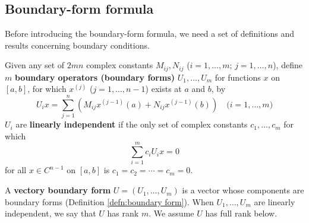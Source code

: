 \documentclass[11pt, oneside, a4paper]{article}
\begin{document}
\subsection{Boundary-form formula}
Before introducing the boundary-form formula, we need a set of definitions and results concerning boundary conditions.

\begin{defn}\label{defn:boundary form}
    Given any set of $2mn$ complex constants $M_{ij}, N_{ij}$ ($i=1,\ldots, m;\,j=1,\ldots,n$), define $m$ \textbf{boundary operators (boundary forms)} $U_1,\ldots,U_m$ for functions $x$ on $[a,b]$, for which $x^{(j)}$ ($j=1,\ldots,n-1$) exists at $a$ and $b$, by
    \begin{equation}\label{eq:U_i defn}
        U_i x = \sum_{j=1}^n (M_{ij}x^{(j-1)}(a) + N_{ij}x^{(j-1)}(b))\quad\mbox{($i=1,\ldots,m$)} 
    \end{equation}
    $U_i$ are \textbf{linearly independent} if the only set of complex constants $c_1, \ldots, c_m$ for which
    \[\sum_{i=1}^m c_i U_ix=0\]
    for all $x\in C^{n-1}$ on $[a,b]$ is $c_1=c_2=\cdots =c_m=0$.
\end{defn}

\begin{defn}\label{defn:vectory boundary form}
    A \textbf{vectory boundary form} $U=(U_1,\ldots,U_m)$ is a vector whose components are boundary forms (Definition \ref{defn:boundary form}). When $U_1,\ldots,U_m$ are linearly independent, we say that $U$ has rank $m$. We assume $U$ has full rank below.
\end{defn}
\end{document}
